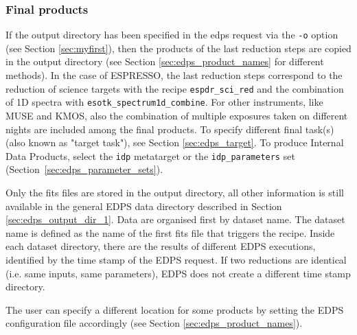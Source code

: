 \subsubsection{Final products}
\label{sec:edps_output_dir_2}

If the output directory has been specified in the edps request via the {\tt -o} option (see Section \ref{sec:myfirst}), then the products of the last reduction steps are copied in the output directory (see Section \ref{sec:edps_product_names} for different methods).  In the case of ESPRESSO, the last reduction steps correspond to the reduction of science targets with the recipe {\tt espdr\_sci\_red} and the combination of 1D spectra with {\tt esotk\_spectrum1d\_combine}. For other instruments, like MUSE and KMOS, also the combination of multiple exposures taken on different nights are included among the final products. To specify different final task(s) (also known as "target task"), see Section \ref{sec:edps_target}. To produce Internal Data Products, select the {\tt idp} metatarget or the {\tt idp\_parameters} set (Section~\ref{sec:edps_parameter_sets}). 

 
Only the fits files are stored in the output directory, all other information is still available in the general EDPS data directory described in Section \ref{sec:edps_output_dir_1}.
Data are organised first by dataset name. The dataset name is defined as the name of the first fits file that triggers the recipe. Inside each dataset directory, there are the results of different EDPS executions, identified by the time stamp of the EDPS request. If two reductions are identical (i.e. same inputs, same parameters), EDPS does not create a different time stamp directory.


The user can specify a different location for some products by setting the EDPS configuration file accordingly (see Section \ref{sec:edps_product_names}).


